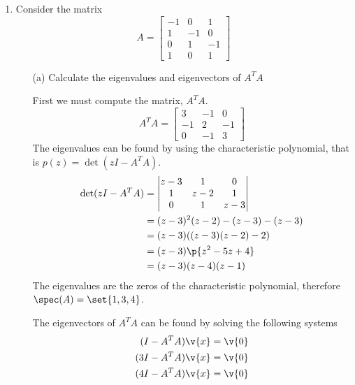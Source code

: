 \documentclass[11pt]{article}
\begin{document}
\begin{enumerate}
    \item %
        Consider the matrix
        \[
            A =
            \begin{bmatrix}
                -1 &  0 &  1 \\
                 1 & -1 &  0 \\
                 0 &  1 & -1 \\
                 1 &  0 &  1
            \end{bmatrix}
        \]
        \begin{enumerate}
            \item[(a)] %
                Calculate the eigenvalues and eigenvectors of $A^T A$

                First we must compute the matrix, $A^T A$.
                \[
                    A^T A =
                    \begin{bmatrix}
                        3 & -1 & 0 \\
                        -1 & 2 & -1 \\
                        0 & -1 & 3
                    \end{bmatrix}
                \]
                The eigenvalues can be found by using the characteristic
                polynomial, that is $p(z) = \det(zI - A^T A)$.
                \begin{align*}
                    \det(zI - A^T A) &=
                    \begin{vmatrix}
                        z - 3 &    1 &     0 \\
                           1 & z - 2 &    1 \\
                            0 &    1 & z - 3
                    \end{vmatrix} \\
                    &= (z - 3)^2(z - 2) - (z - 3) - (z - 3) \\
                    &= (z - 3)((z - 3)(z - 2) - 2) \\
                    &= (z - 3)\p{z^2 - 5z + 4} \\
                    &= (z - 3)(z - 4)(z - 1)
                \end{align*}
                The eigenvalues are the zeros of the characteristic polynomial,
                therefore $\spec(A) = \set{1, 3, 4}$.

                The eigenvectors of $A^T A$ can be found by solving the following systems
                \begin{align*}
                    (I - A^T A)\v{x} &= \v{0} \\
                    (3I - A^T A)\v{x} &= \v{0} \\
                    (4I - A^T A)\v{x} &= \v{0} \\
                \end{align*}


\end{enumerate}
\end{enumerate}
\end{document}
